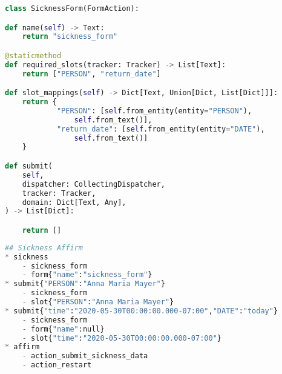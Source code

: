 \begin{lstlisting}[caption={Rasa Slot Filling Action}, label={lst:slot_fill_action},captionpos=b,frame=single,language={Python},commentstyle=\color{mygreen},keywordstyle=\color{blue},
    morekeywords={}]                
class SicknessForm(FormAction):

def name(self) -> Text:
    return "sickness_form"

@staticmethod
def required_slots(tracker: Tracker) -> List[Text]:
    return ["PERSON", "return_date"]

def slot_mappings(self) -> Dict[Text, Union[Dict, List[Dict]]]:
    return {
            "PERSON": [self.from_entity(entity="PERSON"), 
                self.from_text()],
            "return_date": [self.from_entity(entity="DATE"), 
                self.from_text()]
    }

def submit(
    self,
    dispatcher: CollectingDispatcher,
    tracker: Tracker,
    domain: Dict[Text, Any],
) -> List[Dict]:

    return []    
\end{lstlisting} 

\begin{lstlisting}[caption={Rasa Sickness Story}, label={lst:rasa_sickness_story},captionpos=b,frame=single,language={Python},commentstyle=\color{mygreen},keywordstyle=\color{blue},
    morekeywords={sickness, submit, affirm}]                
## Sickness Affirm
* sickness
    - sickness_form
    - form{"name":"sickness_form"}
* submit{"PERSON":"Anna Maria Mayer"}
    - sickness_form
    - slot{"PERSON":"Anna Maria Mayer"}
* submit{"time":"2020-05-30T00:00:00.000-07:00","DATE":"today"}
    - sickness_form
    - form{"name":null}
    - slot{"time":"2020-05-30T00:00:00.000-07:00"}
* affirm
    - action_submit_sickness_data
    - action_restart
\end{lstlisting} 

